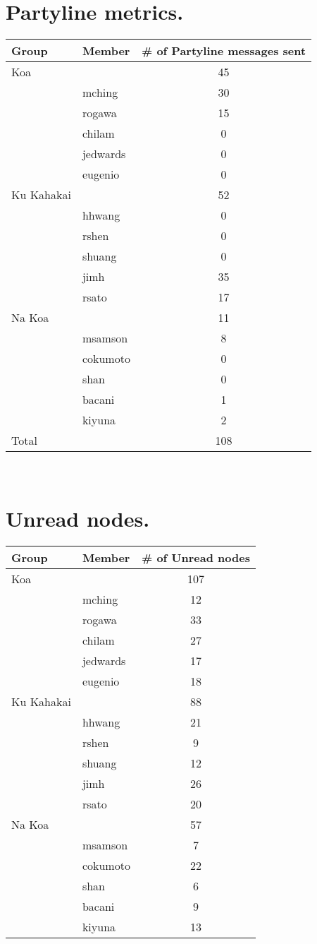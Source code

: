 \section{Partyline metrics.}
\begin{tabular}{|l|l|c|}
\hline
Group&Member&\# of Partyline messages sent\\
\hline
\hline
Koa&&45\\
\hline
&mching&30\\
&rogawa&15\\
&chilam&0\\
&jedwards&0\\
&eugenio&0\\
\hline
\hline
Ku Kahakai&&52\\
\hline
&hhwang&0\\
&rshen&0\\
&shuang&0\\
&jimh&35\\
&rsato&17\\
\hline
\hline
Na Koa&&11\\
\hline
&msamson&8\\
&cokumoto&0\\
&shan&0\\
&bacani&1\\
&kiyuna&2\\
\hline
\hline
Total&&108\\
\hline
\end{tabular} \\


\section{Unread nodes.}
\begin{tabular}{|l|l|c|}
\hline
Group&Member&\# of Unread nodes\\
\hline
\hline
Koa&&107\\
\hline
&mching&12\\
&rogawa&33\\
&chilam&27\\
&jedwards&17\\
&eugenio&18\\
\hline
\hline
Ku Kahakai&&88\\
\hline
&hhwang&21\\
&rshen&9\\
&shuang&12\\
&jimh&26\\
&rsato&20\\
\hline
\hline
Na Koa&&57\\
\hline
&msamson&7\\
&cokumoto&22\\
&shan&6\\
&bacani&9\\
&kiyuna&13\\
\hline
\end{tabular} \\


